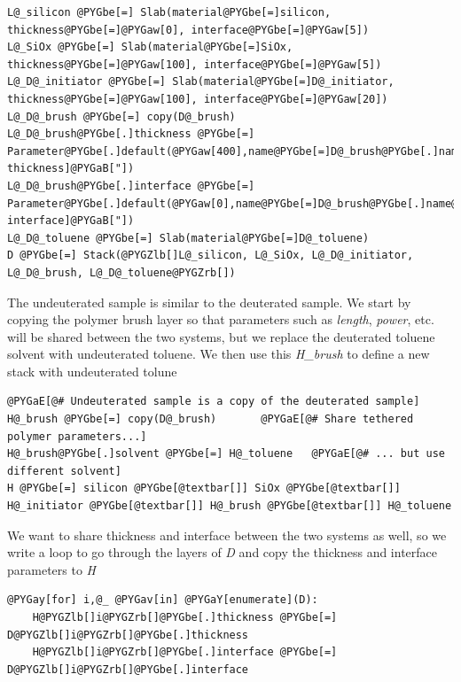 \documentclass[letterpaper,10pt,english]{sphinxmanual}
\begin{document}
\begin{Verbatim}[commandchars=@\[\]]
L@_silicon @PYGbe[=] Slab(material@PYGbe[=]silicon, thickness@PYGbe[=]@PYGaw[0], interface@PYGbe[=]@PYGaw[5])
L@_SiOx @PYGbe[=] Slab(material@PYGbe[=]SiOx, thickness@PYGbe[=]@PYGaw[100], interface@PYGbe[=]@PYGaw[5])
L@_D@_initiator @PYGbe[=] Slab(material@PYGbe[=]D@_initiator, thickness@PYGbe[=]@PYGaw[100], interface@PYGbe[=]@PYGaw[20])
L@_D@_brush @PYGbe[=] copy(D@_brush)
L@_D@_brush@PYGbe[.]thickness @PYGbe[=] Parameter@PYGbe[.]default(@PYGaw[400],name@PYGbe[=]D@_brush@PYGbe[.]name@PYGbe[+]@PYGaB["]@PYGaB[ thickness]@PYGaB["])
L@_D@_brush@PYGbe[.]interface @PYGbe[=] Parameter@PYGbe[.]default(@PYGaw[0],name@PYGbe[=]D@_brush@PYGbe[.]name@PYGbe[+]@PYGaB["]@PYGaB[ interface]@PYGaB["])
L@_D@_toluene @PYGbe[=] Slab(material@PYGbe[=]D@_toluene)
D @PYGbe[=] Stack(@PYGZlb[]L@_silicon, L@_SiOx, L@_D@_initiator, L@_D@_brush, L@_D@_toluene@PYGZrb[])
\end{Verbatim}

The undeuterated sample is similar to the deuterated sample. We start
by copying the polymer brush layer so that parameters such as \emph{length},
\emph{power}, etc. will be shared between the two systems, but we replace the
deuterated toluene solvent with undeuterated toluene.  We then use
this \emph{H\_brush} to define a new stack with undeuterated tolune

\begin{Verbatim}[commandchars=@\[\]]
@PYGaE[@# Undeuterated sample is a copy of the deuterated sample]
H@_brush @PYGbe[=] copy(D@_brush)       @PYGaE[@# Share tethered polymer parameters...]
H@_brush@PYGbe[.]solvent @PYGbe[=] H@_toluene   @PYGaE[@# ... but use different solvent]
H @PYGbe[=] silicon @PYGbe[@textbar[]] SiOx @PYGbe[@textbar[]] H@_initiator @PYGbe[@textbar[]] H@_brush @PYGbe[@textbar[]] H@_toluene
\end{Verbatim}

We want to share thickness and interface between the two systems
as well, so we write a loop to go through the layers of \emph{D} and
copy the thickness and interface parameters to \emph{H}

\begin{Verbatim}[commandchars=@\[\]]
@PYGay[for] i,@_ @PYGav[in] @PYGaY[enumerate](D):
    H@PYGZlb[]i@PYGZrb[]@PYGbe[.]thickness @PYGbe[=] D@PYGZlb[]i@PYGZrb[]@PYGbe[.]thickness
    H@PYGZlb[]i@PYGZrb[]@PYGbe[.]interface @PYGbe[=] D@PYGZlb[]i@PYGZrb[]@PYGbe[.]interface
\end{Verbatim}
\end{document}
